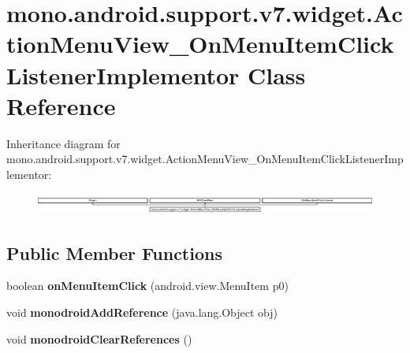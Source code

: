 \hypertarget{classmono_1_1android_1_1support_1_1v7_1_1widget_1_1_action_menu_view___on_menu_item_click_listener_implementor}{}\section{mono.\+android.\+support.\+v7.\+widget.\+Action\+Menu\+View\+\_\+\+On\+Menu\+Item\+Click\+Listener\+Implementor Class Reference}
\label{classmono_1_1android_1_1support_1_1v7_1_1widget_1_1_action_menu_view___on_menu_item_click_listener_implementor}
Inheritance diagram for mono.\+android.\+support.\+v7.\+widget.\+Action\+Menu\+View\+\_\+\+On\+Menu\+Item\+Click\+Listener\+Implementor\+:\begin{figure}[H]
\begin{center}
\leavevmode
\includegraphics[height=0.719332cm]{classmono_1_1android_1_1support_1_1v7_1_1widget_1_1_action_menu_view___on_menu_item_click_listener_implementor}
\end{center}
\end{figure}
\subsection*{Public Member Functions}
\begin{DoxyCompactItemize}
\item 
\mbox{\label{classmono_1_1android_1_1support_1_1v7_1_1widget_1_1_action_menu_view___on_menu_item_click_listener_implementor_aa7f3b619c6a59d9cdca534581c1a6296}} 
boolean {\bfseries on\+Menu\+Item\+Click} (android.\+view.\+Menu\+Item p0)
\item 
\mbox{\label{classmono_1_1android_1_1support_1_1v7_1_1widget_1_1_action_menu_view___on_menu_item_click_listener_implementor_ae2429823c873f4a58b4cf51c81bc06e9}} 
void {\bfseries monodroid\+Add\+Reference} (java.\+lang.\+Object obj)
\item 
\mbox{\label{classmono_1_1android_1_1support_1_1v7_1_1widget_1_1_action_menu_view___on_menu_item_click_listener_implementor_a9e0f4ab4d26d48e5e567bd67f4464001}} 
void {\bfseries monodroid\+Clear\+References} ()
\end{DoxyCompactItemize}
